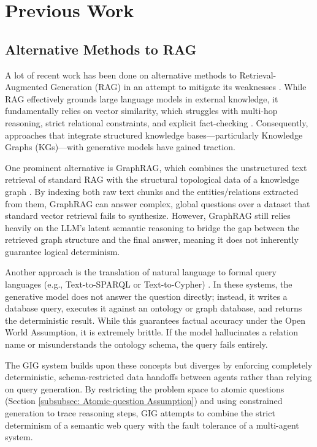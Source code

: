 \section{Previous Work}

\subsection{Alternative Methods to RAG}
A lot of recent work has been done on alternative methods to Retrieval-Augmented Generation (RAG) in an attempt to mitigate its weaknesses \citep{gao2023retrieval}. While RAG effectively grounds large language models in external knowledge, it fundamentally relies on vector similarity, which struggles with multi-hop reasoning, strict relational constraints, and explicit fact-checking \citep{edge2024identifying}. Consequently, approaches that integrate structured knowledge bases—particularly Knowledge Graphs (KGs)—with generative models have gained traction.

One prominent alternative is GraphRAG, which combines the unstructured text retrieval of standard RAG with the structural topological data of a knowledge graph \citep{edge2024identifying}. By indexing both raw text chunks and the entities/relations extracted from them, GraphRAG can answer complex, global questions over a dataset that standard vector retrieval fails to synthesize. However, GraphRAG still relies heavily on the LLM's latent semantic reasoning to bridge the gap between the retrieved graph structure and the final answer, meaning it does not inherently guarantee logical determinism.

Another approach is the translation of natural language to formal query languages (e.g., Text-to-SPARQL or Text-to-Cypher) \citep{kaufmann2014evaluating}. In these systems, the generative model does not answer the question directly; instead, it writes a database query, executes it against an ontology or graph database, and returns the deterministic result. While this guarantees factual accuracy under the Open World Assumption, it is extremely brittle. If the model hallucinates a relation name or misunderstands the ontology schema, the query fails entirely.

The GIG system builds upon these concepts but diverges by enforcing completely deterministic, schema-restricted data handoffs between agents rather than relying on query generation. By restricting the problem space to atomic questions (Section \ref{subsubsec: Atomic-question Assumption}) and using constrained generation to trace reasoning steps, GIG attempts to combine the strict determinism of a semantic web query with the fault tolerance of a multi-agent system.

